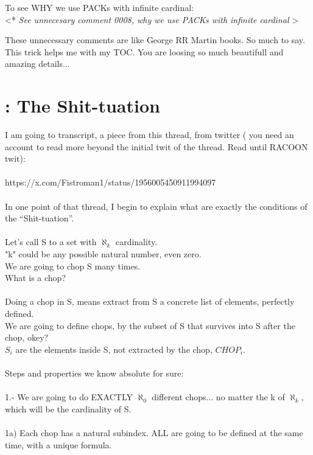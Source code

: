 		\noindent
		To see WHY we use PACKs with infinite cardinal:\\
		\textless ** \textit{See unnecesary comment 0008, why we use PACKs with infinite cardinal} \textgreater
		
		\noindent
		These unnecessary comments are like George RR Martin books. So much to say. This trick helps me with my TOC. You are loosing so much beautifull and amazing details...
		
	\section{\:: The Shit-tuation}
		
		\noindent
		I am going to transcript, a piece from this thread, from twitter ( you need an account to read more beyond the initial twit of the thread. Read until RACOON twit):\\\\
		https://x.com/Fistroman1/status/1956005450911994097\\\\
		In one point of that thread, I begin to explain what are exactly the conditions of the ``Shit-tuation''.
		\\\\
		
		\noindent
		Let's call S to a set with $\aleph_{k}$ cardinality.\\
		"k" could be any possible natural number, even zero.\\
		We are going to chop S many times.\\		
		What is a chop?
		\\\\
		
		\noindent
		Doing a chop in S, means extract from S a concrete list of elements, perfectly defined.\\
		We are going to define chops, by the subset of S that survives into S after the chop, okey?\\
		$S_{i}$ are the elements inside S, not extracted by the chop, $CHOP_{i}$.
		\\\\
		
		\noindent
		Steps and properties we know absolute for sure:\\\\
		1.- We are going to do EXACTLY $\aleph_{0}$ different chops... no matter the k of $\aleph_{k}$, which will be the cardinality of S.\\\\
		1a) Each chop has a natural subindex. ALL are going to be defined at the same time, with a unique formula.
		\\\\
		
